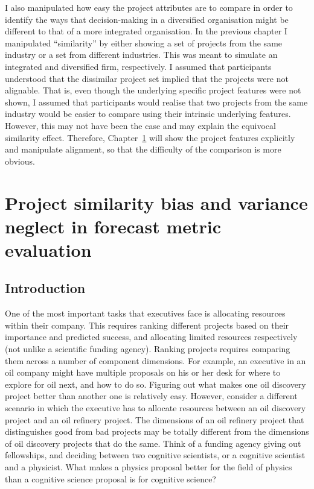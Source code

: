 \documentclass[a4paper, nobind, dvipsnames]{templates/ociamthesis}
\theoremstyle{definition}
\theoremstyle{definition}
\theoremstyle{definition}
\theoremstyle{definition}
\theoremstyle{remark}
\begin{document}
I also manipulated how easy the project attributes are to compare in order to
identify the ways that decision-making in a diversified organisation might be
different to that of a more integrated organisation. In the previous chapter I
manipulated ``similarity'' by either showing a set of projects from the same
industry or a set from different industries. This was meant to simulate an
integrated and diversified firm, respectively. I assumed that participants
understood that the dissimilar project set implied that the projects were not
alignable. That is, even though the underlying specific project features were
not shown, I assumed that participants would realise that two projects from the
same industry would be easier to compare using their intrinsic underlying
features. However, this may not have been the case and may explain the equivocal
similarity effect. Therefore, Chapter~\ref{alignment} will show the project
features explicitly and manipulate alignment, so that the difficulty of the
comparison is more obvious.

\hypertarget{alignment}{%
\chapter{Project similarity bias and variance neglect in forecast metric evaluation}\label{alignment}}

\minitoc

\section{Introduction}

One of the most important tasks that executives face is allocating resources
within their company. This requires ranking different projects based on their
importance and predicted success, and allocating limited resources respectively
(not unlike a scientific funding agency). Ranking projects requires comparing
them across a number of component dimensions. For example, an executive in an
oil company might have multiple proposals on his or her desk for where to
explore for oil next, and how to do so. Figuring out what makes one oil
discovery project better than another one is relatively easy. However, consider
a different scenario in which the executive has to allocate resources between an
oil discovery project and an oil refinery project. The dimensions of an oil
refinery project that distinguishes good from bad projects may be totally
different from the dimensions of oil discovery projects that do the same. Think
of a funding agency giving out fellowships, and deciding between two cognitive
scientists, or a cognitive scientist and a physicist. What makes a physics
proposal better for the field of physics than a cognitive science proposal is
for cognitive science?
\end{document}
